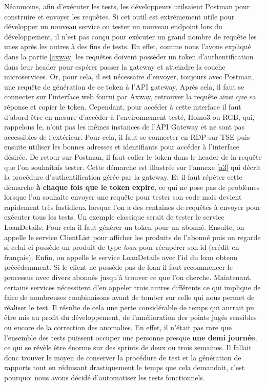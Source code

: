 	Néanmoins, afin d'exécuter les tests, les développeurs utilsaient Postman pour construire et envoyer les requêtes. Si cet outil est extrèmement utile pour développer un nouveau service ou tester un nouveau endpoint lors du développement, il n'est pas conçu pour exécuter un grand nombre de requête les unes après les autres à des fins de tests. En effet, comme nous l'avons expliqué dans la partie \ref{axway} les requêtes doivent posséder un token d'authentification dans leur header pour espérer passer la gateway et atteindre la couche microservices. Or, pour cela, il est nécessaire d'envoyer, toujours avec Postman, une requête de génération de ce token à l'API gateway. Après cela, il faut se connecter sur l'interface web fourni par Axway, retrouver la requête ainsi que sa réponse et copier le token. Cependant, pour accéder à cette interface il faut d'abord être en mesure d'accéder à l'environnement testé, Homo3 ou RGB, qui, rappelons le, n'ont pas les mêmes instances de l'API Gateway et ne sont pas accessibles de l'extérieur. Pour cela, il faut se connecter en RDP sur TSE puis ensuite utiliser les bonnes adresses et identifiants pour accéder à l'interface désirée. De retour sur Postman, il faut coller le token dans le header de la requête que l'on souhaitais tester. Cette démarche est illustrée sur l'annexe \ref{a3} qui décrit la procédure d'authentification gérée par la gateway. Et il faut répéter cette démarche \textbf{à chaque fois que le token expire}, ce qui ne pose pas de problèmes lorsque l'on souhaite envoyer une requête pour tester son code mais devient rapidement très fastidieux lorsque l'on a des centaines de requêtes à envoyer pour exécuter tous les tests. 
	Un exemple classique serait de tester le service LoanDetails. Pour cela il faut générer un token pour un abonné. Ensuite, on appelle le service ClientList pour afficher les produits de l'abonné puis on regarde si celui-ci possède un produit de type \textit{loan} pour récupérer son id (crédit en français). Enfin, on appelle le service LoanDetails avec l'id du loan obtenu précédemment. Si le client ne possède pas de loan il faut recommencer le processus avec divers abonnés jusqu'à trouver ce que l'on cherche. Maintenant, certains services nécessitent d'en   appeler trois autres différents ce qui implique de faire de nombreuses combinaisons avant de tomber sur celle qui nous permet de réaliser le test. Il résulte de cela une perte considérable de temps qui aurrait pu être mis au profit du développement, de l'amélioration des points jugés sensibles ou encore de la correction des anomalies. En effet, il n'était pas rare que l'ensemble des tests puissent occuper une personne presque \textbf{une demi journée}, ce qui se révèle être énorme sur des sprints de deux ou trois semaines. Il fallait donc trouver le moyen de conserver la procédure de test et la génération de rapports tout en réduisant drastiquement le temps que cela demandait, c'est pourquoi nous avons décidé d'automatiser les tests fonctionnels.
	
	